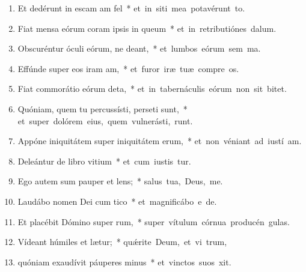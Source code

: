 \begin{flushleft}
\begin{enumerate}[leftmargin=*]
\item Et dedérunt in escam am fel~* \mbox{et in siti mea potavérunt  to.}

\item Fiat mensa eórum coram ipsis in queum~* \mbox{et in retributiónes   dalum.}

\item Obscuréntur óculi eórum, ne deant,~* \mbox{et lumbos eórum sem ma.}

\item Effúnde super eos iram am,~* \mbox{et furor iræ tuæ compre os.}

\item Fiat commorátio eórum deta,~* \mbox{et in tabernáculis eórum non sit  bitet.}

\item Quóniam, quem tu percussísti, perseti sunt,~* \mbox{et super dolórem eius, quem vulnerásti, runt.}

\item Appóne iniquitátem super iniquitátem erum,~* \mbox{et non véniant ad iustí am.}

\item Deleántur de libro vitium~* \mbox{et cum iustis  tur.}

\item Ego autem sum pauper et lens;~* \mbox{salus tua, Deus,  me.}

\item Laudábo nomen Dei cum tico~* \mbox{et magnificábo e  de.}

\item Et placébit Dómino super rum,~* \mbox{super vítulum córnua producén  gulas.}

\item Vídeant húmiles et lætur;~* \mbox{qu\'{\ae}rite Deum, et vi  trum,}

\item quóniam exaudívit páuperes minus~* \mbox{et vinctos suos  xit.}


\end{enumerate}
\end{flushleft}

